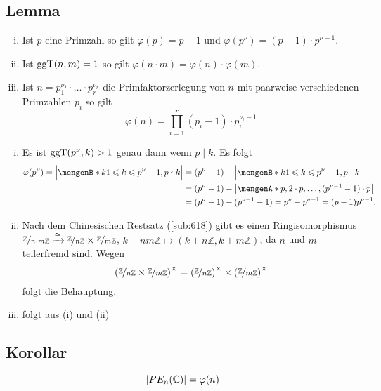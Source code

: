 \subsection[Lemma über die Funktionswerte von $\varphi$]{Lemma} %
\label{sub:196}
\begin{enumerate}[(i)]
	\item Ist $p$ eine Primzahl so gilt $\varphi(p)= p-1$ und $\varphi(p^\nu) =(p-1) \cdot p^{\nu -1}$.
	\item Ist $\ggT(n,m)=1$ so gilt $\varphi(n \cdot m)= \varphi(n) \cdot \varphi(m)$.
	\item Ist $n= p_1^{\nu_1} \cdot \ldots \cdot p_r^{\nu_r}$ die Primfaktorzerlegung von $n$ mit paarweise verschiedenen Primzahlen $p_i$ so gilt 
	\[
		\varphi(n) = \prod_{i=1}^r (p_i -1) \cdot p_i^{\nu_i-1}
	\]
\end{enumerate}
\begin{enumerate}[(i)]
	\item Es ist $\ggT(p^\nu,k)>1$ genau dann wenn $p \mid k$. Es folgt 
	\begin{align*}
		\varphi(p^\nu) = \abs*{ \set[k]{1 \le k \le p^\nu -1, \rule{0cm}{0.4cm} p \nmid k} } &= (p^\nu -1) - \abs*{ \set[k]{1 \le k \le p^\nu -1 , \rule{0cm}{0.4cm}p \mid k} }  \\
		&= (p^\nu -1) - \abs*{\set{p, 2 \cdot p, \ldots , (p^{\nu -1} -1)\cdot p} } \\
		&= (p^\nu -1) -(p^{\nu -1} -1) = p^\nu - p^{\nu-1} = (p-1) p^{\nu -1}.
	\end{align*}
	\item Nach dem Chinesischen Restsatz (\ref{sub:618}) gibt es einen Ringisomorphismus 
	$\nicefrac{\mathds{Z}}{n \cdot m \mathds{Z}} \xrightarrow{\cong}  \nicefrac{\mathds{Z}}{n \mathds{Z}} \times \nicefrac{\mathds{Z}}{m \mathds{Z}}$,
	$k+ nm \mathds{Z} \mapsto (k+ n \mathds{Z}, k+ m \mathds{Z})$, da $n$ und $m$ teilerfremd
	sind. Wegen
	\[
		\enbrace*{\nicefrac{\mathds{Z}}{n \mathds{Z}} \times \nicefrac{\mathds{Z}}{m \mathds{Z}}}^\times = \enbrace*{\nicefrac{\mathds{Z}}{n \mathds{Z}}}^\times \times 
		\enbrace*{\nicefrac{\mathds{Z}}{m \mathds{Z}}  }^\times
	\]
	folgt die Behauptung.
	\item folgt aus (i) und (ii) \bewende
\end{enumerate}

\subsection[Korollar: $\abs*{PE_n(\mathds{C})} = \varphi(n)$]{Korollar} %
\label{sub:197}
\[
	\abs*{PE_n(\mathds{C})} = \varphi(n) 
\]

